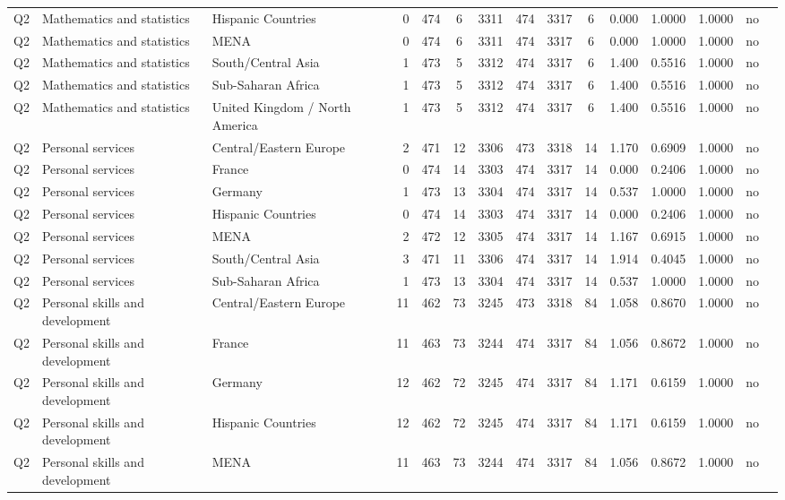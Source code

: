 \begin{longtable}{lllrcccccccccll}
Q2 & Mathematics and statistics & Hispanic Countries & 0 & 474 & 6 & 3311 & 474 & 3317 & 6 & 0.000 & 1.0000 & 1.0000 & no \\
Q2 & Mathematics and statistics & MENA & 0 & 474 & 6 & 3311 & 474 & 3317 & 6 & 0.000 & 1.0000 & 1.0000 & no \\
Q2 & Mathematics and statistics & South/Central Asia & 1 & 473 & 5 & 3312 & 474 & 3317 & 6 & 1.400 & 0.5516 & 1.0000 & no \\
Q2 & Mathematics and statistics & Sub-Saharan Africa & 1 & 473 & 5 & 3312 & 474 & 3317 & 6 & 1.400 & 0.5516 & 1.0000 & no \\
Q2 & Mathematics and statistics & United Kingdom / North America & 1 & 473 & 5 & 3312 & 474 & 3317 & 6 & 1.400 & 0.5516 & 1.0000 & no \\
Q2 & Personal services & Central/Eastern Europe & 2 & 471 & 12 & 3306 & 473 & 3318 & 14 & 1.170 & 0.6909 & 1.0000 & no \\
Q2 & Personal services & France & 0 & 474 & 14 & 3303 & 474 & 3317 & 14 & 0.000 & 0.2406 & 1.0000 & no \\
Q2 & Personal services & Germany & 1 & 473 & 13 & 3304 & 474 & 3317 & 14 & 0.537 & 1.0000 & 1.0000 & no \\
Q2 & Personal services & Hispanic Countries & 0 & 474 & 14 & 3303 & 474 & 3317 & 14 & 0.000 & 0.2406 & 1.0000 & no \\
Q2 & Personal services & MENA & 2 & 472 & 12 & 3305 & 474 & 3317 & 14 & 1.167 & 0.6915 & 1.0000 & no \\
Q2 & Personal services & South/Central Asia & 3 & 471 & 11 & 3306 & 474 & 3317 & 14 & 1.914 & 0.4045 & 1.0000 & no \\
Q2 & Personal services & Sub-Saharan Africa & 1 & 473 & 13 & 3304 & 474 & 3317 & 14 & 0.537 & 1.0000 & 1.0000 & no \\
Q2 & Personal skills and development & Central/Eastern Europe & 11 & 462 & 73 & 3245 & 473 & 3318 & 84 & 1.058 & 0.8670 & 1.0000 & no \\
Q2 & Personal skills and development & France & 11 & 463 & 73 & 3244 & 474 & 3317 & 84 & 1.056 & 0.8672 & 1.0000 & no \\
Q2 & Personal skills and development & Germany & 12 & 462 & 72 & 3245 & 474 & 3317 & 84 & 1.171 & 0.6159 & 1.0000 & no \\
Q2 & Personal skills and development & Hispanic Countries & 12 & 462 & 72 & 3245 & 474 & 3317 & 84 & 1.171 & 0.6159 & 1.0000 & no \\
Q2 & Personal skills and development & MENA & 11 & 463 & 73 & 3244 & 474 & 3317 & 84 & 1.056 & 0.8672 & 1.0000 & no \\

\end{longtable}
